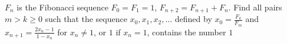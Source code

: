 $F_n$ is the Fibonacci sequence $F_0 = F_1 = 1$, $F_{n+2} = F_{n+1} + F_n$. Find all pairs $m > k \geq 0$ such that the sequence $x_0, x_1, x_2, ...$ defined by $x_0 = \frac{F_k}{F_m}$ and $x_{n+1} = \frac{2x_n - 1}{1 - x_n}$ for $x_n \not = 1$, or $1$ if $x_n = 1$, contains the number $1$